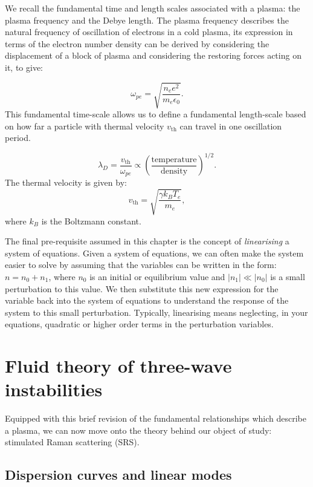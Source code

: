We recall the fundamental time and length scales associated with a plasma: the plasma frequency and the Debye length. The plasma frequency describes the natural frequency of oscillation of electrons in a cold plasma, its expression in terms of the electron number density can be derived by considering the displacement of a block of plasma and considering the restoring forces acting on it, to give:

\begin{equation}
	\omega_{pe} = \sqrt{\frac{n_e e^2}{m_e \epsilon_0}}.
\end{equation} This fundamental time-scale allows us to define a fundamental length-scale based on how far a particle with thermal velocity $v_{\text{th}}$ can travel in one oscillation period.

\begin{equation}
	\lambda_D = \frac{v_{\mathrm{th}}}{\omega_{pe}} \propto \left(\frac{\mathrm{temperature}}{\mathrm{density}}\right)^{1/2}.
\end{equation}\label{eqn:debye} The thermal velocity is given by:
\begin{equation}
	v_{\text{th}} = \sqrt{\frac{\gamma k_BT_e}{m_e}},
\end{equation}\label{eqn:vth} where $k_B$ is the Boltzmann constant.

The final pre-requisite assumed in this chapter is the concept of \textit{linearising} a system of equations. Given a system of equations, we can often make the system easier to solve by assuming that the variables can be written in the form: $n = n_0 + n_1$, where $n_0$ is an initial or equilibrium value and $|n_1| \ll |n_0|$ is a small perturbation to this value. We then substitute this new expression for the variable back into the system of equations to understand the response of the system to this small perturbation. Typically, linearising means neglecting, in your equations, quadratic or higher order terms in the perturbation variables. 

\section{Fluid theory of three-wave instabilities}
Equipped with this brief revision of the fundamental relationships which describe a plasma, we can now move onto the theory behind our object of study: stimulated Raman scattering (\acrshort{SRS}).

\subsection{Dispersion curves and linear modes}

